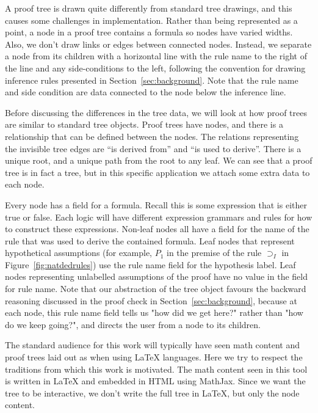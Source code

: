 \documentclass[conference]{IEEEtran}
\begin{document}
A proof tree is drawn quite differently from standard tree drawings, and this causes some challenges in implementation. Rather than being represented as a point, a node in a proof tree contains a formula so nodes have varied widths. Also, we don't draw links or edges between connected nodes. Instead, we separate a node from its children with a horizontal line with the rule name to the right of the line and any side-conditions to the left, following the convention for drawing inference rules presented in Section~\ref{sec:background}. Note that the rule name and side condition are data connected to the node below the inference line.

Before discussing the differences in the tree data, we will look at how proof trees are similar to standard tree objects. Proof trees have nodes, and there is a relationship that can be defined between the nodes. The relations representing the invisible tree edges are ``is derived from'' and ``is used to derive''. There is a unique root, and a unique path from the root to any leaf. We can see that a proof tree is in fact a tree, but in this specific application we attach some extra data to each node.

Every node has a field for a formula. Recall this is some expression that is either true or false. Each logic will have different expression grammars and rules for how to construct these expressions. Non-leaf nodes all have a field for the name of the rule that was used to derive the contained formula. Leaf nodes that represent hypothetical assumptions (for example, $P_1$ in the premise of the rule $\supset_I$ in Figure~\ref{fig:natdedrules}) use the rule name field for the hypothesis label. Leaf nodes representing unlabelled assumptions of the proof have no value in the field for rule name. Note that our abstraction of the tree object favours the backward reasoning discussed in the proof check in Section~\ref{sec:background}, because at each node, this rule name field tells us "how did we get here?" rather than "how do we keep going?", and directs the user from a node to its children.

The standard audience for this work will typically have seen math content and proof trees laid out as when using \LaTeX{} languages. Here we try to respect the traditions from which this work is motivated. The math content seen in this tool is written in \LaTeX{} and embedded in HTML using MathJax. Since we want the tree to be interactive, we don't write the full tree in \LaTeX{}, but only the node content.
\end{document}
